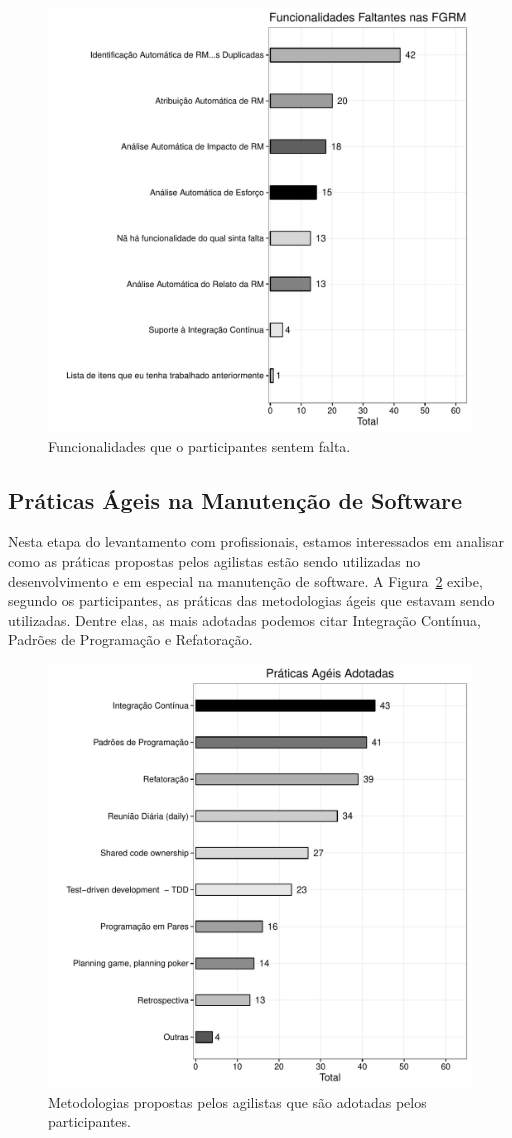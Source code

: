 \begin{figure}[htpb]
	\centering
	\includegraphics[width=0.5\linewidth]{./chapter-pesquisa-com-profissionais/img/grafico_melhorias_fgrm_funcionalidades_faltantes.pdf}
	\caption{Funcionalidades que o participantes sentem falta.}
\label{fig:grafico_melhorias_fgrm_funcionalidades_falantes}
\end{figure}

\subsection{Práticas Ágeis na Manutenção de Software}
\label{sub:práticas_ágeis_na_manutenção_de_software}

Nesta etapa do levantamento com profissionais, estamos interessados em analisar
como as práticas propostas pelos agilistas estão sendo utilizadas no
desenvolvimento e em especial na manutenção de software. A
Figura~\ref{fig:grafico_melhorias_fgrm_praticas_ageis_adotadas} exibe, segundo
os participantes, as práticas das metodologias ágeis que estavam sendo
utilizadas. Dentre elas, as mais adotadas podemos citar Integração Contínua,
Padrões de Programação e Refatoração.

\begin{figure}[htpb]
	\centering
    \includegraphics[width=0.5\linewidth]{./chapter-pesquisa-com-profissionais/img/grafico_melhorias_fgrm_praticas_ageis_adotadas.pdf}
    \caption{Metodologias propostas pelos agilistas que são adotadas pelos
        participantes.}
    \label{fig:grafico_melhorias_fgrm_praticas_ageis_adotadas} \end{figure}


